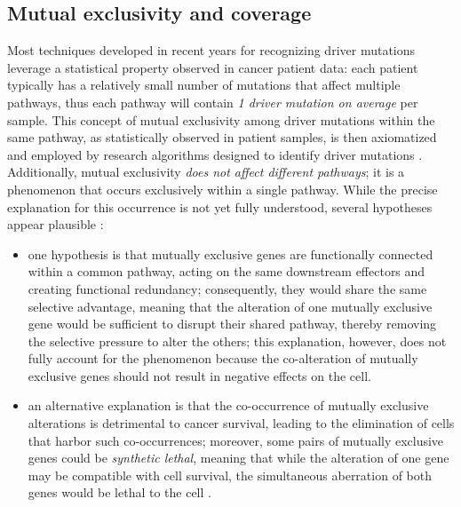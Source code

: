 \subsection{Mutual exclusivity and coverage}

Most techniques developed in recent years for recognizing driver mutations leverage a statistical property observed in cancer patient data: each patient typically has a relatively small number of mutations that affect multiple pathways, thus each pathway will contain \textit{1 driver mutation on average} per sample. This concept of mutual exclusivity among driver mutations within the same pathway, as statistically observed in patient samples, is then axiomatized and employed by research algorithms designed to identify driver mutations \cite{multi-dendrix}. Additionally, mutual exclusivity \textit{does not affect different pathways}; it is a phenomenon that occurs exclusively within a single pathway. While the precise explanation for this occurrence is not yet fully understood, several hypotheses appear plausible \cite{survey, mutual_exclusivity_expls, dendrix}:

\begin{itemize}
    \item one hypothesis is that mutually exclusive genes are functionally connected within a common pathway, acting on the same downstream effectors and creating functional redundancy; consequently, they would share the same selective advantage, meaning that the alteration of one mutually exclusive gene would be sufficient to disrupt their shared pathway, thereby removing the selective pressure to alter the others; this explanation, however, does not fully account for the phenomenon because the co-alteration of mutually exclusive genes should not result in negative effects on the cell.
    \item an alternative explanation is that the co-occurrence of mutually exclusive alterations is detrimental to cancer survival, leading to the elimination of cells that harbor such co-occurrences; moreover, some pairs of mutually exclusive genes could be \textit{synthetic lethal}, meaning that while the alteration of one gene may be compatible with cell survival, the simultaneous aberration of both genes would be lethal to the cell .
\end{itemize}

